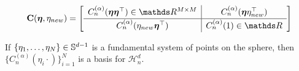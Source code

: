 \begin{equation}
    \renewcommand\arraystretch{1.3}
    \MC(\veta, \eta_{new}) =
    \left[
        \begin{array}{c|c}
          C_n^{(\alpha)}(\veta\veta\transpose) \in \Reals^{M \times M} & C_n^{(\alpha)}(\veta\eta_{new}\transpose) \\
          \hline
          C_n^{(\alpha)}(\eta_{new}\veta\transpose) & C_n^{(\alpha)}(1) \in \Reals
        \end{array}
    \right]
\end{equation}


\begin{theorem}
    If $\{\eta_1, \ldots, \eta_N \} \in \mathbb{S}^{d-1}$ is a fundamental system of points on the sphere, then $\{C_n^{(\alpha)}(\eta_i \cdot)\}_{i=1}^N$ is a basis for $\mathcal{H}_n^d$.
\end{theorem}





